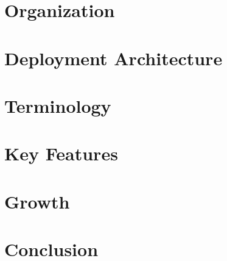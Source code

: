 \section{Organization}

\section{Deployment Architecture}

\section{Terminology}

\section{Key Features}

\section{Growth}

\section{Conclusion}


 
